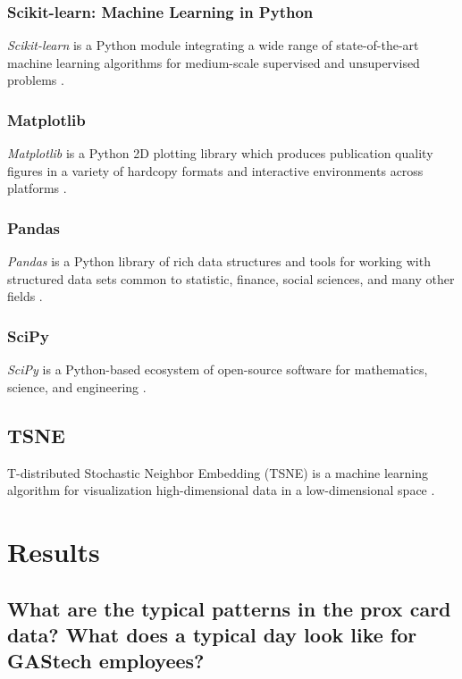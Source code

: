 \documentclass[aps, 10pt, a4paper]{article}
\begin{document}
            \subsubsection{Scikit-learn: Machine Learning in Python}
                \textit{Scikit-learn} is a Python module integrating a wide range of state-of-the-art machine learning algorithms for medium-scale supervised and unsupervised problems \cite{ref:sklearn1}.
                
            \subsubsection{Matplotlib}
                \textit{Matplotlib} is a Python 2D plotting library which produces publication quality figures in a variety of hardcopy formats and interactive environments across platforms \cite{ref:matplotlib1}.
                
            \subsubsection{Pandas}
                \textit{Pandas} is a Python library of rich data structures and tools for working with structured data sets common to statistic, finance, social sciences, and many other fields \cite{ref:pandas1}.
                
            \subsubsection{SciPy}
                \textit{SciPy} is a Python-based ecosystem of open-source software for mathematics, science, and engineering \cite{ref:scipy1}.
                
        \subsection{TSNE}
            T-distributed Stochastic Neighbor Embedding (TSNE) is a machine learning algorithm for visualization high-dimensional data in a low-dimensional space \cite{ref:tsne1}.
    
    \section{Results}
        \subsection[Question 1]{What are the typical patterns in the prox card data? What does a typical day look like for GAStech employees?}
            \label{sec:question1}
\end{document}
